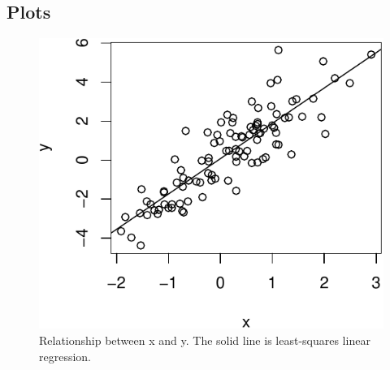 \documentclass[]{article}
\begin{document}
\subsection{Plots}\label{plots}

\begin{figure}[htbp]
\centering
\includegraphics{rR4_files/figure-latex/carDataPlot-1.pdf}
\caption{Relationship between x and y. The solid line is least-squares
linear regression.}
\end{figure}
\end{document}
